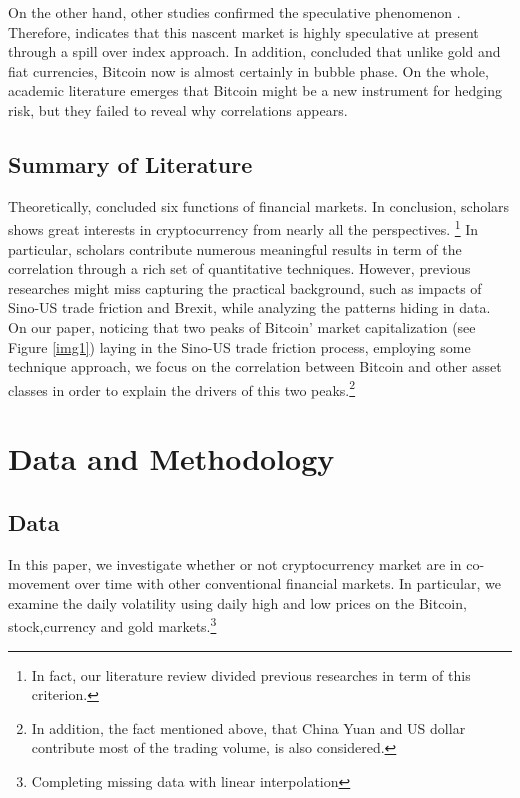 \documentclass[review]{elsarticle}
\begin{document}
On the other hand, other studies confirmed the speculative phenomenon \cite{Fry2016, cheah2015speculative,bouri2019co}. Therefore, \cite{trabelsi2018there} indicates that this nascent market is highly speculative at present through a spill over index approach. In addition, \cite{Corbet2018} concluded that unlike gold and fiat currencies, Bitcoin now is almost certainly in bubble phase. On the whole, academic literature emerges that Bitcoin might be a new instrument for hedging risk, but they failed to reveal why correlations appears. 

\subsection{Summary of Literature}
Theoretically, \cite{crane1995global} concluded six functions of financial markets. In conclusion, scholars shows great interests in cryptocurrency from nearly all the perspectives. \footnote{In fact, our literature review divided previous researches in term of this criterion.} In particular, scholars contribute numerous meaningful results in term of the correlation through a rich set of quantitative techniques. However, previous researches might miss capturing the practical background, such as impacts of Sino-US trade friction and Brexit, while analyzing the patterns hiding in data. On our paper, noticing that two peaks of Bitcoin' market capitalization (see Figure \ref{img1}) laying in the Sino-US trade friction process, employing some technique approach, we focus on the correlation between Bitcoin and other asset classes in order to explain the drivers of this two peaks.\footnote{In addition, the fact mentioned above, that China Yuan and US dollar contribute most of the trading volume, is also considered.} 



\section{Data and Methodology}
\subsection{Data}
In this paper, we investigate whether or not cryptocurrency market are in co-movement over time with other conventional financial markets. In particular, we examine the daily volatility using daily high and low prices on the Bitcoin, stock,currency and gold markets.\footnote{Completing missing data with linear interpolation}
\end{document}
